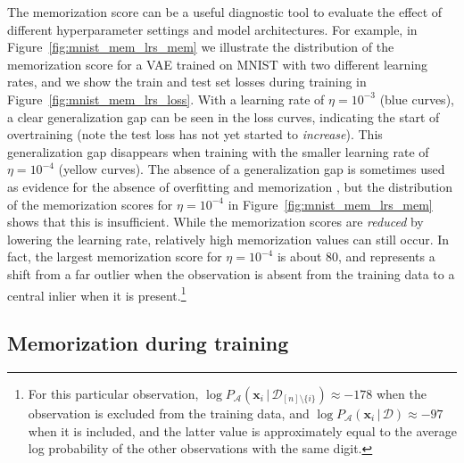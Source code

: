 \documentclass{article}
\newcommand{\bft}[1]{\mathbf{#1}}
\newcommand{\given}{\,|\,}
\begin{document}
The memorization score can be a useful diagnostic tool to evaluate the effect 
of different hyperparameter settings and model architectures. For example, in 
Figure~\ref{fig:mnist_mem_lrs_mem} we illustrate the distribution of the 
memorization score for a VAE trained on MNIST with two different learning 
rates, and we show the train and test set losses during training in 
Figure~\ref{fig:mnist_mem_lrs_loss}. With a learning rate of $\eta = 10^{-3}$ 
(blue curves), a clear generalization gap can be seen in the loss curves, 
indicating the start of overtraining (note the test loss has not yet started 
to \emph{increase}). This generalization gap disappears when training with the 
smaller learning rate of $\eta = 10^{-4}$ (yellow curves).  The absence of a 
generalization gap is sometimes used as evidence for the absence of 
overfitting and memorization \cite{wu2016quantitative}, but the distribution 
of the memorization scores for $\eta = 10^{-4}$ in 
Figure~\ref{fig:mnist_mem_lrs_mem} shows that this is insufficient.  While the 
memorization scores are \emph{reduced} by lowering the learning rate, 
relatively high memorization values can still occur. In fact, the largest 
memorization score for $\eta = 10^{-4}$ is about 80, and represents a shift 
from a far outlier when the observation is absent from the training data to a 
central inlier when it is present.\footnote{For this particular observation, 
	$\log P_{\mathcal{A}}(\bft{x}_i \given \mathcal{D}_{[n] \setminus 
		\{i\}}) \approx -178$ when the observation is excluded from 
	the training data, and $\log P_{\mathcal{A}}(\bft{x}_i \given 
	\mathcal{D}) \approx -97$ when it is included, and the latter value is 
	approximately equal to the average log probability of the other 
	observations with the same digit.}

\subsection{Memorization during training}
\end{document}
